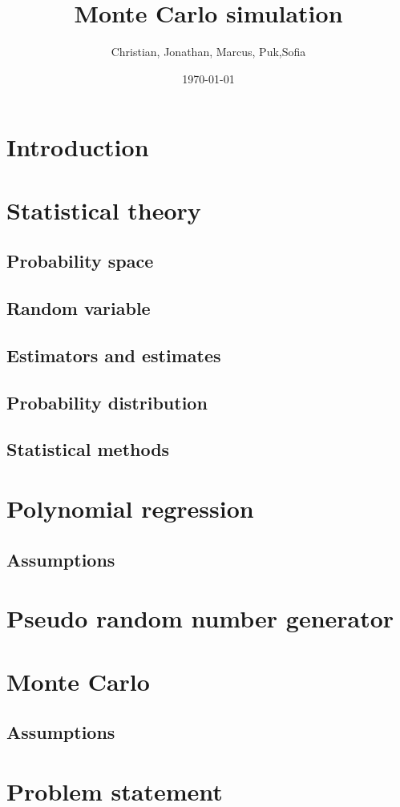 \documentclass{article}
\title{Monte Carlo simulation}
\author{Christian, Jonathan, Marcus, Puk,Sofia }
\date{\today}
\begin{document}
	\maketitle
	\newpage
	\tableofcontents
	\newpage
	\section{Introduction}
	\newpage
	\section{Statistical theory}
	\subsection{Probability space}
	\subsection{Random variable}
	\subsection{Estimators and estimates}
	\subsection{Probability distribution}
	\subsection{Statistical methods}
	\newpage
	\section{Polynomial regression}
	\subsection{Assumptions}
	\newpage
	\section{Pseudo random number generator}
	\newpage
	\section{Monte Carlo}
	\subsection{Assumptions}
	\newpage
	\section{Problem statement}
	\newpage
\end{document}
